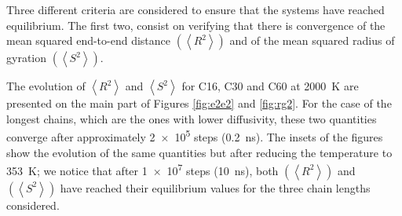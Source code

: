 \documentclass[aps,prb,reprint,superscriptaddress, a4paper]{revtex4-1}
\begin{document}
Three different criteria are considered to ensure that the systems have reached equilibrium. The first two, consist on verifying that there is convergence of the mean squared end-to-end distance $\left(\left< R^2 \right> \right)$ and of the mean squared radius of gyration $\left(\left< S^2 \right> \right)$.

The evolution of $\left< R^2 \right>$ and   $\left< S^2 \right>$  for C16, C30 and C60 at \SI{2000}{\kelvin} are presented on the main part of Figures  \ref{fig:e2e2} and \ref{fig:rg2}. For the case of the longest chains, which are the ones with lower diffusivity, these two quantities converge after approximately \SI{2e5}{} steps (\SI{0.2}{\nano\second}). The insets of the figures show the evolution of the same quantities but after reducing the temperature to \SI{353}{\kelvin}; we notice that after \SI{1e7}{} steps (\SI{10}{\nano\second}), both $\left(\left< R^2 \right> \right)$ and   $\left(\left< S^2 \right> \right)$ have reached their equilibrium values for the three  chain lengths considered.

\end{document}
